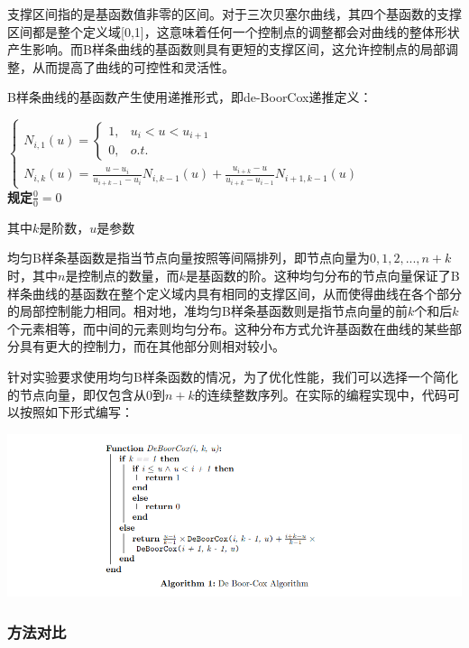 \documentclass[a4paper,UTF8]{article}
\theoremstyle{definition}
\begin{document}
支撑区间指的是基函数值非零的区间。对于三次贝塞尔曲线，其四个基函数的支撑区间都是整个定义域[0,1]，这意味着任何一个控制点的调整都会对曲线的整体形状产生影响。而B样条曲线的基函数则具有更短的支撑区间，这允许控制点的局部调整，从而提高了曲线的可控性和灵活性。

B样条曲线的基函数产生使用递推形式，即de-BoorCox递推定义：

\begin{center}
	$
	\begin{cases}  
		N_{i,1}(u)=\begin{cases}
			1,	& u_i < u < u_{i+1}	\\
			0, 	& o.t.
		\end{cases} \\
		N_{i,k}(u)=\frac{u-u_i}{u_{i+k-1}-u_i}N_{i,k-1}(u)+\frac{u_{i+k}-u}{u_{i+k}-u_{i-1}}N_{i+1,k-1}(u)
	\end{cases} 
	$	\\
	\textbf{规定$\frac{0}{0}=0$}
\end{center}

其中$k$是阶数，$u$是参数

均匀B样条基函数是指当节点向量按照等间隔排列，即节点向量为$0,1,2,...,n+k$时，其中$n$是控制点的数量，而$k$是基函数的阶。这种均匀分布的节点向量保证了B样条曲线的基函数在整个定义域内具有相同的支撑区间，从而使得曲线在各个部分的局部控制能力相同。相对地，准均匀B样条基函数则是指节点向量的前$k$个和后$k$个元素相等，而中间的元素则均匀分布。这种分布方式允许基函数在曲线的某些部分具有更大的控制力，而在其他部分则相对较小。

针对实验要求使用均匀B样条函数的情况，为了优化性能，我们可以选择一个简化的节点向量，即仅包含从$0$到$n+k$的连续整数序列。在实际的编程实现中，代码可以按照如下形式编写：

\begin{center}
	\includegraphics[width=6in]{figs/algorithm1.png}
\end{center}

\subsubsection{方法对比}
\end{document}
